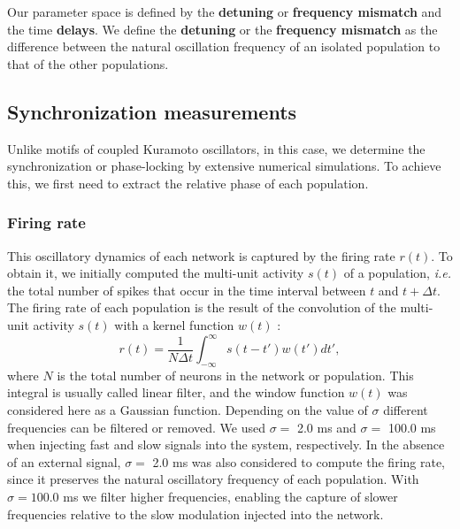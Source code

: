 \documentclass[../main.tex]{subfiles}
\begin{document}
Our parameter space is defined by the \textbf{detuning} or \textbf{frequency mismatch}
and the time \textbf{delays}.
We define the \textbf{detuning} or the \textbf{frequency mismatch} as the difference between the natural oscillation frequency of an isolated population to that of the other populations.

\subsection{Synchronization measurements}
Unlike motifs of coupled Kuramoto oscillators, in this case, we determine the synchronization or phase-locking by extensive numerical simulations.
To achieve this, we first need to extract the relative phase of each population.

\subsubsection{Firing rate}
This oscillatory dynamics of each network is captured by the firing rate $r(t)$.
To obtain it, we initially computed the multi-unit activity $s(t)$ of a population, \textit{i.e.} the total number of spikes that occur in the time interval between $t$ and $t+\Delta t$.
The firing rate of each population is the result of the convolution of the multi-unit activity $s(t)$ with a kernel function $w(t)$ \citep{dayan2003theoretical}:
\begin{equation}
r(t) = \displaystyle\frac{1}{N\Delta t}\displaystyle\int_{-\infty}^\infty s(t-t')w(t')dt',
\end{equation}
where $N$ is the total number of neurons in the network or population. 
This integral is usually called linear filter, and the window function $w(t)$ was considered here as a Gaussian function.
Depending on the value of $\sigma$ different frequencies can be filtered or removed.
We used $\sigma =$ 2.0 ms and $\sigma =$ 100.0 ms when injecting fast and slow signals into the system, respectively. 
In the absence of an external signal, $\sigma =$ 2.0 ms was also considered to compute the firing rate, since it preserves the natural oscillatory frequency of each population.
With $\sigma = 100.0$ ms we filter higher frequencies, enabling the capture of slower frequencies relative to the slow modulation injected into the network.
\end{document}
